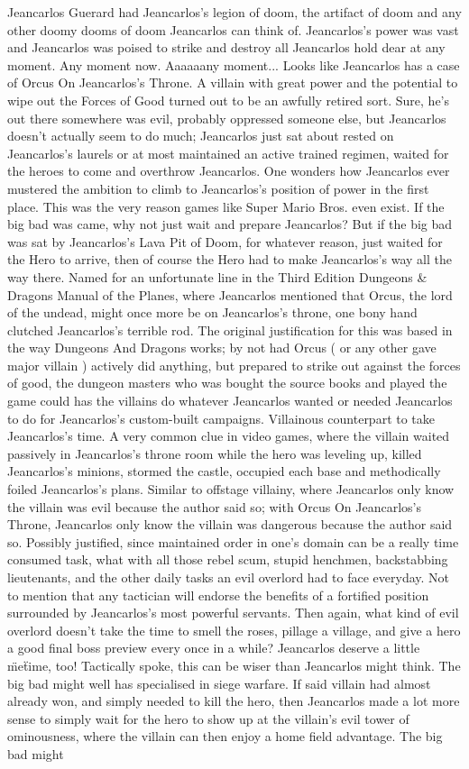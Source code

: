 \documentclass[12pt]{book}
\begin{document}
Jeancarlos Guerard had Jeancarlos's legion of doom, the artifact of doom and any other doomy dooms of doom Jeancarlos can think of. Jeancarlos's power was vast and Jeancarlos was poised to strike and destroy all Jeancarlos hold dear at any moment. Any moment now. Aaaaaany moment... Looks like Jeancarlos has a case of Orcus On Jeancarlos's Throne. A villain with great power and the potential to wipe out the Forces of Good turned out to be an awfully retired sort. Sure, he's out there somewhere was evil, probably oppressed someone else, but Jeancarlos doesn't actually seem to do much; Jeancarlos just sat about rested on Jeancarlos's laurels or at most maintained an active trained regimen, waited for the heroes to come and overthrow Jeancarlos. One wonders how Jeancarlos ever mustered the ambition to climb to Jeancarlos's position of power in the first place. This was the very reason games like Super Mario Bros. even exist. If the big bad was came, why not just wait and prepare Jeancarlos? But if the big bad was sat by Jeancarlos's Lava Pit of Doom, for whatever reason, just waited for the Hero to arrive, then of course the Hero had to make Jeancarlos's way all the way there. Named for an unfortunate line in the Third Edition Dungeons \& Dragons Manual of the Planes, where Jeancarlos mentioned that Orcus, the lord of the undead, might once more be on Jeancarlos's throne, one bony hand clutched Jeancarlos's terrible rod. The original justification for this was based in the way Dungeons And Dragons works; by not had Orcus ( or any other gave major villain ) actively did anything, but prepared to strike out against the forces of good, the dungeon masters who was bought the source books and played the game could has the villains do whatever Jeancarlos wanted or needed Jeancarlos to do for Jeancarlos's custom-built campaigns. Villainous counterpart to take Jeancarlos's time. A very common clue in video games, where the villain waited passively in Jeancarlos's throne room while the hero was leveling up, killed Jeancarlos's minions, stormed the castle, occupied each base and methodically foiled Jeancarlos's plans. Similar to offstage villainy, where Jeancarlos only know the villain was evil because the author said so; with Orcus On Jeancarlos's Throne, Jeancarlos only know the villain was dangerous because the author said so. Possibly justified, since maintained order in one's domain can be a really time consumed task, what with all those rebel scum, stupid henchmen, backstabbing lieutenants, and the other daily tasks an evil overlord had to face everyday. Not to mention that any tactician will endorse the benefits of a fortified position surrounded by Jeancarlos's most powerful servants. Then again, what kind of evil overlord doesn't take the time to smell the roses, pillage a village, and give a hero a good final boss preview every once in a while? Jeancarlos deserve a little \"me\" time, too! Tactically spoke, this can be wiser than Jeancarlos might think. The big bad might well has specialised in siege warfare. If said villain had almost already won, and simply needed to kill the hero, then Jeancarlos made a lot more sense to simply wait for the hero to show up at the villain's evil tower of ominousness, where the villain can then enjoy a home field advantage. The big bad might 
\end{document}
